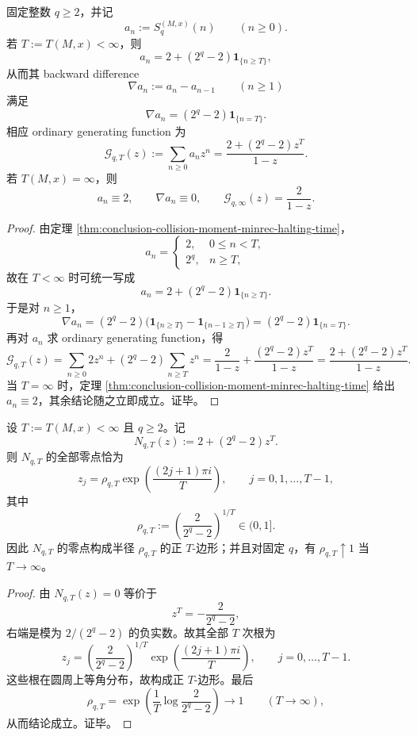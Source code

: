 \begin{theorem}[碰撞矩序列的一次脉冲律与精确生成函数]\label{thm:conclusion-collision-moment-single-pulse-ogf}
固定整数 \(q\ge 2\)，并记
\[
a_n:=S_q^{(M,x)}(n)\qquad (n\ge 0).
\]
若 \(T:=T(M,x)<\infty\)，则
\[
a_n=2+(2^q-2)\mathbf 1_{\{n\ge T\}},
\]
从而其 backward difference
\[
\nabla a_n:=a_n-a_{n-1}\qquad(n\ge 1)
\]
满足
\[
\nabla a_n=(2^q-2)\mathbf 1_{\{n=T\}}.
\]
相应 ordinary generating function 为
\[
\mathcal G_{q,T}(z):=\sum_{n\ge 0}a_n z^n
=
\frac{2+(2^q-2)z^T}{1-z}.
\]
若 \(T(M,x)=\infty\)，则
\[
a_n\equiv 2,\qquad
\nabla a_n\equiv 0,\qquad
\mathcal G_{q,\infty}(z)=\frac{2}{1-z}.
\]
\end{theorem}
\begin{proof}
由定理 \ref{thm:conclusion-collision-moment-minrec-halting-time}，
\[
a_n=
\begin{cases}
2,& 0\le n<T,\\
2^q,& n\ge T,
\end{cases}
\]
故在 \(T<\infty\) 时可统一写成
\[
a_n=2+(2^q-2)\mathbf 1_{\{n\ge T\}}.
\]
于是对 \(n\ge 1\)，
\[
\nabla a_n
=(2^q-2)\bigl(\mathbf 1_{\{n\ge T\}}-\mathbf 1_{\{n-1\ge T\}}\bigr)
=(2^q-2)\mathbf 1_{\{n=T\}}.
\]
再对 \(a_n\) 求 ordinary generating function，得
\[
\mathcal G_{q,T}(z)
=
\sum_{n\ge 0}2z^n+(2^q-2)\sum_{n\ge T}z^n
=
\frac{2}{1-z}+\frac{(2^q-2)z^T}{1-z}
=
\frac{2+(2^q-2)z^T}{1-z}.
\]
当 \(T=\infty\) 时，定理 \ref{thm:conclusion-collision-moment-minrec-halting-time} 给出 \(a_n\equiv 2\)，其余结论随之立即成立。证毕。
\end{proof}


\begin{corollary}[碰撞生成函数分子零点的正多边形结构]\label{cor:conclusion-collision-numerator-regular-polygon-zeros}
设 \(T:=T(M,x)<\infty\) 且 \(q\ge 2\)。记
\[
N_{q,T}(z):=2+(2^q-2)z^T.
\]
则 \(N_{q,T}\) 的全部零点恰为
\[
z_j=\rho_{q,T}\exp\!\left(\frac{(2j+1)\pi i}{T}\right),
\qquad
j=0,1,\dots,T-1,
\]
其中
\[
\rho_{q,T}:=\left(\frac{2}{2^q-2}\right)^{1/T}\in(0,1].
\]
因此 \(N_{q,T}\) 的零点构成半径 \(\rho_{q,T}\) 的正 \(T\)-边形；并且对固定 \(q\)，有 \(\rho_{q,T}\uparrow 1\) 当 \(T\to\infty\)。
\end{corollary}
\begin{proof}
由 \(N_{q,T}(z)=0\) 等价于
\[
z^T=-\frac{2}{2^q-2},
\]
右端是模为 \(2/(2^q-2)\) 的负实数。故其全部 \(T\) 次根为
\[
z_j=
\left(\frac{2}{2^q-2}\right)^{1/T}
\exp\!\left(\frac{(2j+1)\pi i}{T}\right),
\qquad
j=0,\dots,T-1.
\]
这些根在圆周上等角分布，故构成正 \(T\)-边形。最后
\[
\rho_{q,T}
=
\exp\!\left(\frac{1}{T}\log\frac{2}{2^q-2}\right)\to 1
\qquad(T\to\infty),
\]
从而结论成立。证毕。
\end{proof}

